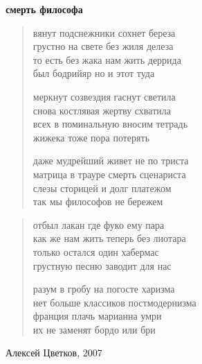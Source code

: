 \documentclass{beamer}
\begin{document}
\begin{frame}

\begin{center}
\textbf{смерть философа}
\end{center}

\begin{verse}
вянут подснежники сохнет береза\\
грустно на свете без жиля делеза\\
то есть без жака нам жить деррида\\
был бодрийяр но и этот туда

меркнут созвездия гаснут светила\\
снова костлявая жертву схватила\\
всех в поминальную вносим тетрадь\\
жижека тоже пора потерять

даже мудрейший живет не по триста\\
матрица в трауре смерть сценариста\\
слезы сторицей и долг платежом\\
так мы философов не бережем
\end{verse}

\end{frame}

\begin{frame}
\begin{verse}
отбыл лакан где фуко ему пара\\
как же нам жить теперь без лиотара\\
только остался один хабермас\\
грустную песню заводит для нас

разум в гробу на погосте харизма\\
нет больше классиков постмодернизма\\
франция плачь марианна умри\\
их не заменят бордо или бри

\end{verse}
Алексей Цветков, 2007
\end{frame}
\end{document}
